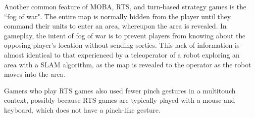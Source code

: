 Another common feature of MOBA, RTS, and turn-based strategy games is the ``fog of war". 
The entire map is normally hidden from the player until they command their units to enter an area, whereupon the area is revealed. 
In gameplay, the intent of fog of war is to prevent players from knowing about the opposing player's location without sending sorties. 
This lack of information is almost identical to that experienced by a teleoperator of a robot exploring an area with a SLAM algorithm, as the map is revealed to the operator as the robot moves into the area. 


Gamers who play RTS games also used fewer pinch gestures in a multitouch context, possibly because RTS games are typically played with a mouse and keyboard, which does not have a pinch-like gesture. 

